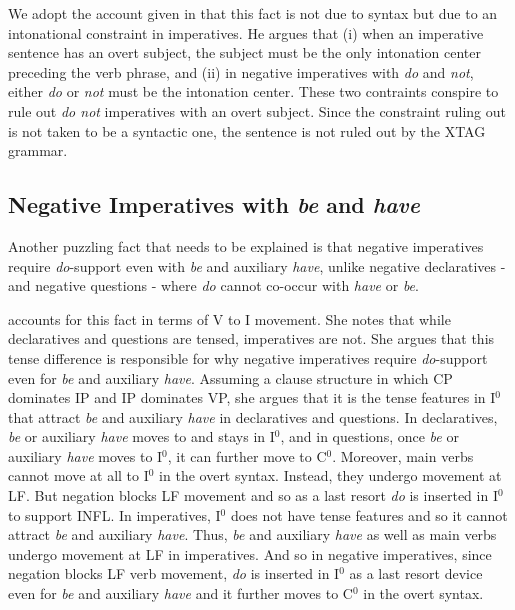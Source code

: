 
We adopt the account given in \cite{akmajian84} that this fact is not due
to syntax but due to an intonational constraint in imperatives.  He argues
that (i) when an imperative sentence has an overt subject, the subject must be
the only intonation center preceding the verb phrase, and (ii) in
negative imperatives with {\it do} and {\it not}, either {\it do} or {\it
not} must be the intonation center.  These two contraints conspire to rule
out {\it do not} imperatives with an overt subject. 
Since the constraint ruling out  is not taken to be a syntactic one, the
sentence is not ruled out by the XTAG grammar.

\subsection{Negative Imperatives with {\it be} and {\it have}}

Another puzzling fact that needs to be explained is that negative imperatives
require {\it do}-support even with {\it be} and auxiliary {\it have}, unlike
negative declaratives - and negative questions - where
{\it do} cannot co-occur with {\it have} or {\it be}.




\cite{handiss} accounts for this fact in terms of V to I movement. She
notes that while declaratives and questions are tensed, imperatives are
not. She argues that this tense difference is responsible for why negative
imperatives require {\it do}-support even for {\it be} and auxiliary {\it
have}.  Assuming a clause structure in which CP dominates IP and IP dominates
VP, she argues that it is the tense features in I$^0$
that attract {\it be} and auxiliary {\it have} in declaratives and questions.
In declaratives, {\it be} or auxiliary {\it have} moves to and stays in I$^0$,
and in questions, once {\it be} or auxiliary {\it have} moves to I$^0$, it can
further move to C$^0$.  Moreover, main verbs cannot move at all to I$^0$ in the
overt syntax.  Instead, they undergo movement at LF.  But negation blocks LF
movement and so as a last resort {\it do} is inserted in I$^0$ to support INFL.
In imperatives, I$^0$ does not have tense features and so it cannot attract
{\it be} and auxiliary {\it have}.  Thus, {\it be} and auxiliary {\it have} as
well as main verbs undergo movement at LF in imperatives.  And so in negative
imperatives, since negation blocks LF verb movement, {\it do} is inserted in
I$^0$ as a last resort device even for {\it be} and auxiliary {\it have} and it
further moves to C$^0$ in the overt syntax.

